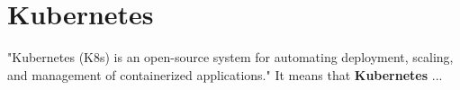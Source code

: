 \section{Kubernetes}\label{sec:kubernetes}
"Kubernetes (K8s) is an open-source system for automating deployment, scaling, and management of containerized applications."\cite{kubernetes}
It means that \textbf{Kubernetes} ...
